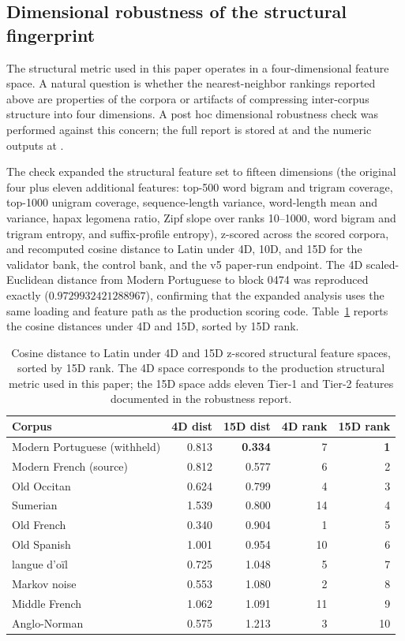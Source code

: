 \documentclass[11pt]{article}
\begin{document}
\subsection{Dimensional robustness of the structural fingerprint}
\label{sec:dimensional-robustness}

The structural metric used in this paper operates in a four-dimensional
feature space. A natural question is whether the nearest-neighbor rankings
reported above are properties of the corpora or artifacts of compressing
inter-corpus structure into four dimensions. A post hoc dimensional
robustness check was performed against this concern; the full report is
stored at
 and the
numeric outputs at
.

The check expanded the structural feature set to fifteen dimensions
(the original four plus eleven additional features: top-500 word bigram
and trigram coverage, top-1000 unigram coverage, sequence-length variance,
word-length mean and variance, hapax legomena ratio, Zipf slope over
ranks 10--1000, word bigram and trigram entropy, and suffix-profile
entropy), z-scored across the scored corpora, and recomputed cosine
distance to Latin under 4D, 10D, and 15D for the validator bank, the
control bank, and the v5 paper-run endpoint. The 4D scaled-Euclidean
distance from Modern Portuguese to block 0474 was reproduced exactly
($0.9729932421288967$), confirming that the expanded analysis uses the
same loading and feature path as the production scoring code.
Table~\ref{tab:dimrobust} reports the cosine distances under 4D and 15D,
sorted by 15D rank.

\begin{table}[h]
\centering
\caption{Cosine distance to Latin under 4D and 15D z-scored structural
feature spaces, sorted by 15D rank. The 4D space corresponds to the
production structural metric used in this paper; the 15D space adds
eleven Tier-1 and Tier-2 features documented in the robustness report.}
\label{tab:dimrobust}
\begin{tabular}{lrrrr}
\toprule
Corpus & 4D dist & 15D dist & 4D rank & 15D rank \\
\midrule
Modern Portuguese (withheld) & 0.813 & \textbf{0.334} & 7 & \textbf{1} \\
Modern French (source) & 0.812 & 0.577 & 6 & 2 \\
Old Occitan & 0.624 & 0.799 & 4 & 3 \\
Sumerian & 1.539 & 0.800 & 14 & 4 \\
Old French & 0.340 & 0.904 & 1 & 5 \\
Old Spanish & 1.001 & 0.954 & 10 & 6 \\
langue d'o\"il & 0.725 & 1.048 & 5 & 7 \\
Markov noise & 0.553 & 1.080 & 2 & 8 \\
Middle French & 1.062 & 1.091 & 11 & 9 \\
Anglo-Norman & 0.575 & 1.213 & 3 & 10 \\
\bottomrule
\end{tabular}
\end{table}
\end{document}
